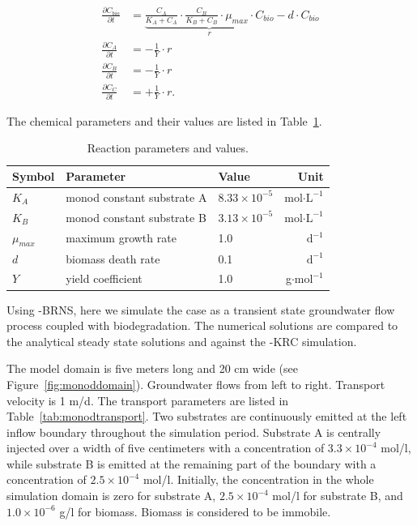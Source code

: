 \begin{align}
\frac{\partial C_{bio}}{\partial t} & = \underset{r}{\underbrace{\frac{C_A}{K_A+C_A}\cdot\frac{C_B}{K_B+C_B}\cdot\mu_{max}\cdot C_{bio}}} -d\cdot C_{bio} \\
\frac{\partial C_{A}}{\partial t} & = -\frac{1}{Y} \cdot r \\
\frac{\partial C_{B}}{\partial t} & = -\frac{1}{Y} \cdot r \\
\frac{\partial C_{C}}{\partial t} & = +\frac{1}{Y} \cdot r.
\end{align}

The chemical parameters and their values are listed in
Table~\ref{tab:monodparams}.

\begin{table}[!th]
\caption{Reaction parameters and values.} %
\label{tab:monodparams} \centering
\begin{tabular}{lllr}
\hline
\bf{Symbol} & \bf{Parameter} & \bf{Value} & \bf{Unit}\\
\hline
$K_A$ & monod constant substrate A & $8.33\times 10^{-5}$ & mol$\cdot \mathrm{L}^{-1}$\\
$K_B$ & monod constant substrate B & $3.13\times 10^{-5}$ & mol$\cdot \mathrm{L}^{-1}$\\
$\mu_{max}$ & maximum growth rate & 1.0 & $\mathrm{d^{-1}}$\\
$d$ & biomass death rate & 0.1 & $\mathrm{d^{-1}}$\\
$Y$ & yield coefficient & 1.0 & g$\cdot \mathrm{mol}^{-1}$\\
\hline
\end{tabular}
\end{table}

Using \GeoSys-BRNS, here we simulate the case as a transient state
groundwater flow process coupled with biodegradation. The numerical solutions
are compared to the analytical steady state solutions and against the \GeoSys-KRC simulation.

The model domain is five meters long and 20 cm wide (see
Figure~\ref{fig:monoddomain}). Groundwater flows from left to right. Transport
velocity is 1 m/d. The transport parameters are listed in
Table~\ref{tab:monodtransport}. Two substrates are continuously emitted at the
left inflow boundary throughout the simulation period. Substrate A is centrally
injected over a width of five centimeters with a concentration of
$3.3\times10^{-4}$ mol/l, while substrate B is emitted at the remaining part of
the boundary with a concentration of $2.5\times10^{-4}$ mol/l. Initially, the
concentration in the whole simulation domain is zero for substrate A,
$2.5\times10^{-4}$ mol/l for substrate B, and $1.0\times10^{-6}$ g/l for
biomass. Biomass is considered to be immobile.

